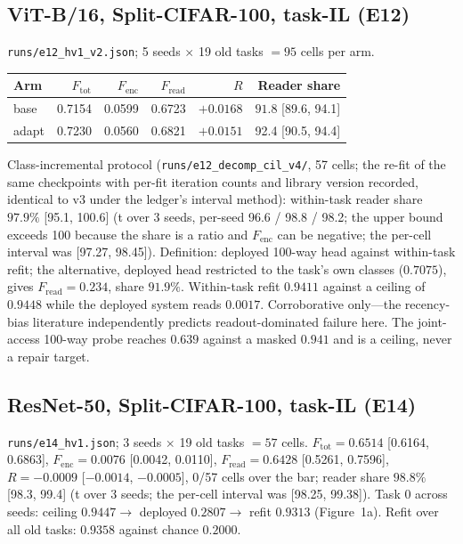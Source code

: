 \subsection{ViT-B/16, Split-CIFAR-100, task-IL (E12)}

\texttt{runs/e12\_hv1\_v2.json}; 5 seeds $\times$ 19 old tasks $= 95$ cells per arm.

\begin{center}\small
\begin{tabular}{@{}lrrrrr@{}}
\toprule
Arm & $F_{\mathrm{tot}}$ & $F_{\mathrm{enc}}$ & $F_{\mathrm{read}}$ & $R$ & Reader share \\
\midrule
base  & 0.7154 & 0.0599 & 0.6723 & $+0.0168$ & $\mathbf{91.8}$ [89.6, 94.1] \\
adapt & 0.7230 & 0.0560 & 0.6821 & $+0.0151$ & 92.4 [90.5, 94.4] \\
\bottomrule
\end{tabular}
\end{center}

Class-incremental protocol (\texttt{runs/e12\_decomp\_cil\_v4/}, 57 cells; the
re-fit of the same checkpoints with per-fit iteration counts and library version
recorded, identical to v3 under the ledger's interval method):
within-task reader share $97.9\%$ [95.1, 100.6] (t over 3 seeds, per-seed 96.6 /
98.8 / 98.2; the upper bound exceeds 100 because the share is a ratio and
$F_{\mathrm{enc}}$ can be negative; the per-cell interval was [97.27, 98.45]).
Definition: deployed 100-way head against within-task refit; the alternative,
deployed head restricted to the task's own classes ($0.7075$), gives
$F_{\mathrm{read}} = 0.234$, share $91.9\%$. Within-task refit
$0.9411$ against a ceiling of $0.9448$ while the deployed system reads $0.0017$.
Corroborative only---the recency-bias literature independently predicts
readout-dominated failure here. The joint-access 100-way probe reaches $0.639$
against a masked $0.941$ and is a ceiling, never a repair target.

\subsection{ResNet-50, Split-CIFAR-100, task-IL (E14)}

\texttt{runs/e14\_hv1.json}; 3 seeds $\times$ 19 old tasks $= 57$ cells.
$F_{\mathrm{tot}} = 0.6514$ [0.6164, 0.6863],
$F_{\mathrm{enc}} = \mathbf{0.0076}$ [0.0042, 0.0110],
$F_{\mathrm{read}} = 0.6428$ [0.5261, 0.7596],
$R = -0.0009$ [$-0.0014$, $-0.0005$], 0/57 cells over the bar; reader share
$\mathbf{98.8\%}$ [98.3, 99.4] (t over 3 seeds; the per-cell interval was [98.25, 99.38]). Task 0 across seeds: ceiling $0.9447
\rightarrow$ deployed $0.2807 \rightarrow$ refit $0.9313$ (Figure~1a). Refit
over all old tasks: $0.9358$ against chance $0.2000$.

